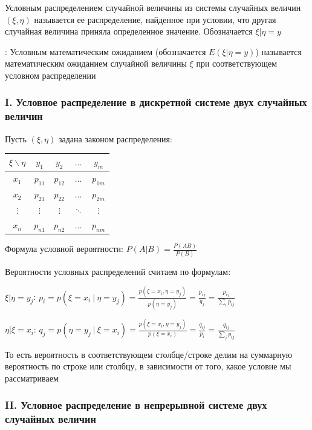 \documentclass[12pt]{article}
\begin{document}
    \Def Условным распределением случайной величины из системы случайных величин $(\xi, \eta)$ 
    называется ее распределение, найденное при условии, что другая случайная величина приняла 
    определенное значение. Обозначается $\xi | \eta = y$

    : Условным математическим ожиданием (обозначается $E(\xi | \eta = y)$) называется 
    математическим ожиданием случайной величины $\xi$ при соответствующем условном распределении

    \subsubsection{I. Условное распределение в дискретной системе двух случайных величин}

    \hypertarget{conditionaldistributionindiscretesystem}{}

    Пусть $(\xi, \eta)$ задана законом распределения:

    \begin{tabular}{c|c|c|c|c}
        $\xi \backslash \eta$ & $y_1$ & $y_2$ & $\dots$ & $y_m$ \\
        \hline
        $x_1$ & $p_{11}$ & $p_{12}$ & $\dots$ & $p_{1m}$ \\
        \hline
        $x_2$ & $p_{21}$ & $p_{22}$ & $\dots$ & $p_{2m}$ \\
        \hline
        $\vdots$ & $\vdots$ & $\vdots$ & $\ddots$ & $\vdots$ \\
        \hline
        $x_n$ & $p_{n1}$ & $p_{n2}$ & $\dots$ & $p_{nm}$ \\
    \end{tabular}

    Формула условной вероятности: $P(A | B) = \frac{P(AB)}{P(B)}$

    Вероятности условных распределений считаем по формулам:

    $\xi | \eta = y_j$: $p_i = p(\xi = x_i \ | \ \eta = y_j) = \frac{p(\xi = x_i, \eta = y_j)}{p(\eta = y_j)} = \frac{p_{ij}}{q_j} = \frac{p_{ij}}{\sum_i p_{ij}}$

    $\eta | \xi = x_i$: $q_j = p(\eta = y_j \ | \ \xi = x_i) = \frac{p(\xi = x_i, \eta = y_j)}{p(\xi = x_i)} = \frac{q_{ij}}{p_i} = \frac{q_{ij}}{\sum_j p_{ij}}$

    То есть вероятность в соответствующем столбце/строке делим на суммарную вероятность по строке или столбцу, в зависимости от того, какое условие мы рассматриваем

    \subsubsection{II. Условное распределение в непрерывной системе двух случайных величин}
\end{document}

